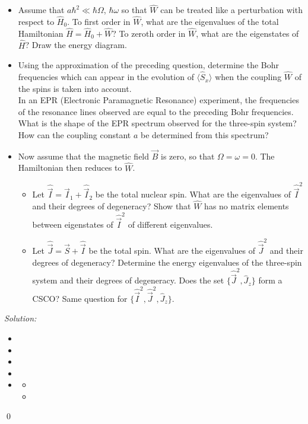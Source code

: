 \documentclass[10pt,a4paper]{article}
\newenvironment{problem}[2][Problem]{\begin{trivlist}
\item[\hskip \labelsep {\bfseries #1}\hskip \labelsep {\bfseries #2.}]}{\end{trivlist}}
\newenvironment{sol}
    {\emph{Solution:}
    }
    {
    \qed
    }
\begin{document}
\begin{problem}{4}
\begin{itemize}
\item[(c)] Assume that $a\hbar^2\ll\hbar\Omega$, $\hbar\omega$ so that $\hat{W}$ can be treated like a perturbation with respect to $\hat{H}_0$. To first order in $\hat{W}$, what are the eigenvalues of the total Hamiltonian $\hat{H}=\hat{H}_0+\hat{W}$? To zeroth order in $\hat{W}$, what are the eigenstates of $\hat{H}$? Draw the energy diagram.
\item[(d)] Using the approximation of the preceding question, determine the Bohr frequencies which can appear in the evolution of $\langle\hat{S}_x\rangle$ when the coupling $\hat{W}$  of the spins is taken into account.\\
In an EPR (Electronic Paramagnetic Resonance) experiment, the frequencies of the resonance lines observed are equal to the preceding Bohr frequencies. What is the shape of the EPR spectrum observed for the three-spin system? How can the coupling constant $a$ be determined from this spectrum?
\item[(e)] Now assume that the magnetic field $\vec{B}$ is zero, so that $\Omega=\omega=0$. The Hamiltonian then reduces to $\hat{W}$.
\begin{itemize}
\item[i.] Let $\hat{\vec{I}}=\hat{\vec{I}}_1+\hat{\vec{I}}_2$ be the total nuclear spin. What are the eigenvalues of $\hat{\vec{I}}^2$ and their degrees of degeneracy? Show that $\hat{W}$ has no matrix elements between eigenstates of $\hat{\vec{I}}^2$ of different eigenvalues.
\item[ii.] Let $\hat{\vec{J}}=\hat{\vec{S}}+\hat{\vec{I}}$ be the total spin. What are the eigenvalues of $\hat{\vec{J}}^2$ and their degrees of degeneracy? Determine the energy eigenvalues of the three-spin system and their degrees of degeneracy. Does the set $\{\hat{\vec{J}}^2,\hat{J}_z\}$ form a CSCO? Same question for $\{\hat{\vec{I}}^2,\hat{\vec{J}}^2,\hat{J}_z\}$.
\end{itemize}
\end{itemize}
\end{problem}
\begin{sol}
\begin{itemize}
\item[(a)] 
\item[(b)] 
\item[(c)] 
\item[(d)] 
\item[(e)]
\begin{itemize}
\item[i.] 
\item[ii.] 
\end{itemize}
\end{itemize}
\end{sol}
\end{document}
